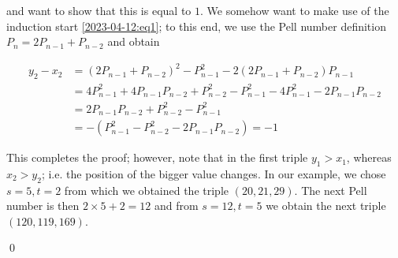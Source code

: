 and want to show that this is equal to $1$. We somehow want to make use of the induction start \ref{2023-04-12:eq1}; to this end, we use the Pell number definition $P_n = 2 P_{n-1} + P_{n-2}$ and obtain

\begin{align*}
    y_2 - x_2 &= (2 P_{n-1} + P_{n-2})^2 - P_{n-1}^2 - 2(2 P_{n-1} + P_{n-2}) P_{n-1} \\
    &= 4 P_{n-1}^2 + 4 P_{n-1} P_{n-2} + P_{n-2}^2 - P_{n-1}^2 - 4 P_{n-1}^2 - 2 P_{n-1} P_{n-2} \\
    &= 2 P_{n-1} P_{n-2} + P_{n-2}^2 - P_{n-1}^2 \\
    &= - (P_{n-1}^2 - P_{n-2}^2 - 2 P_{n-1} P_{n-2} ) = -1
\end{align*}

This completes the proof; however, note that in the first triple $y_1 > x_1$, whereas $x_2 > y_2$; i.e. the position of the bigger value changes. In our example, we chose $s = 5, t=2$ from which we obtained the triple $(20, 21, 29)$. The next Pell number is then $2 \times 5 + 2 = 12$ and from $s = 12, t = 5$ we obtain the next triple $(120, 119, 169)$. 

\qed


